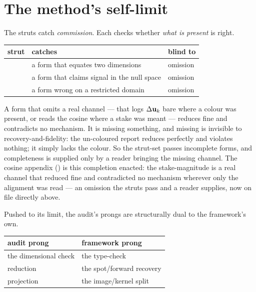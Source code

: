 \documentclass[../main]{subfiles}
\begin{document}
\section{The method's self-limit}
\label{app:self-limit}

The struts catch \emph{commission}. Each checks whether \emph{what is present} is right.

\begin{table}[htbp]
  \centering
  \begin{tabularx}{\textwidth}{@{} l L l @{}}
    \toprule
    \textbf{strut} & \textbf{catches} & \textbf{blind to} \\
    \midrule
     & a form that equates two dimensions & omission \\
     & a form that claims signal in the null space & omission \\
     & a form wrong on a restricted domain & omission \\
    \bottomrule
  \end{tabularx}
\end{table}

A form that omits a real channel --- that logs $\Delta\mathbf{u}\sb{k}$ bare where a colour was present, or
reads the cosine where a stake was meant --- reduces fine and contradicts no mechanism. It is
missing something, and missing is invisible to recovery-and-fidelity: the un-coloured report
reduces perfectly and violates nothing; it simply lacks the colour. So the strut-set passes
incomplete forms, and completeness is supplied only by a reader bringing the missing channel.
The cosine appendix () is this completion enacted: the stake-magnitude is a real channel that reduced fine
and contradicted no mechanism wherever only the alignment was read --- an omission the struts
pass and a reader supplies, now on file directly above.

Pushed to its limit, the audit's prongs are structurally dual to the framework's own.

\begin{table}[htbp]
  \centering
  \begin{tabularx}{\textwidth}{@{} l l @{}}
    \toprule
    \textbf{audit prong} & \textbf{framework prong} \\
    \midrule
    the dimensional check & the type-check \\
    reduction & the spot/forward recovery \\
    projection & the image/kernel split \\
    \bottomrule
  \end{tabularx}
\end{table}
\end{document}
